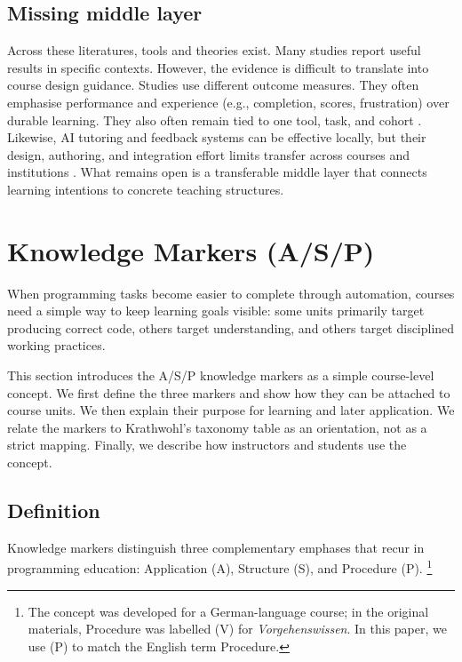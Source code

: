 \documentclass{article}
\begin{document}
\subsection{Missing middle layer}
Across these literatures, tools and theories exist. Many studies report useful results in specific contexts. However, the evidence is difficult to translate into course design guidance. Studies use different outcome measures. They often emphasise performance and experience (e.g., completion, scores, frustration) over durable learning. They also often remain tied to one tool, task, and cohort \citep{RaihanEtAl2025LLMCSeduSLR,BassnerEtAl2026LessStress}. Likewise, AI tutoring and feedback systems can be effective locally, but their design, authoring, and integration effort limits transfer across courses and institutions \citep{KuhailEtAl2023EducationalChatbotsSLR,DermevalEtAl2018ITSAuthoringToolsSLR,Schiff2021OutOfLab}. What remains open is a transferable middle layer that connects learning intentions to concrete teaching structures.



\section{Knowledge Markers (A/S/P)}
\label{sec:asv}
When programming tasks become easier to complete through automation, courses need a simple way to keep learning goals visible: some units primarily target producing correct code, others target understanding, and others target disciplined working practices.\par
This section introduces the A/S/P knowledge markers as a simple course-level concept. We first define the three markers and show how they can be attached to course units. We then explain their purpose for learning and later application. We relate the markers to Krathwohl's taxonomy table \citep{Krathwohl2002} as an orientation, not as a strict mapping. Finally, we describe how instructors and students use the concept.\par

\subsection{Definition}

Knowledge markers distinguish three complementary emphases that recur in programming education: Application (A), Structure (S), and Procedure (P). 
\footnote{The concept was developed for a German-language course; in the original materials, Procedure was labelled (V) for \emph{Vorgehenswissen}. In this paper, we use (P) to match the English term Procedure.}
\end{document}
